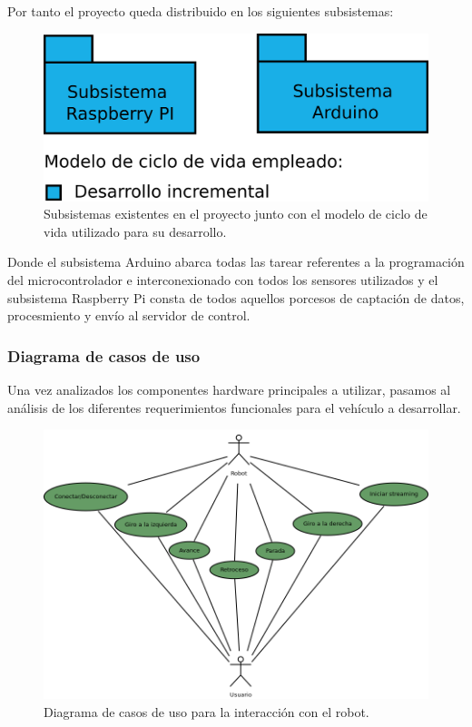 Por tanto el proyecto queda distribuido en los siguientes subsistemas:\\

\begin{figure}[H]
  \begin{center}
    \includegraphics[scale=0.03]{diagramas/subsistemas.png}
  \end{center}
  \caption{Subsistemas existentes en el proyecto junto con el modelo de ciclo de vida
utilizado para su desarrollo.}
  \label{diagrama:subsistemas}
\end{figure}

Donde el subsistema Arduino abarca todas las tarear referentes a la programación del microcontrolador e interconexionado con todos los sensores utilizados y el subsistema Raspberry Pi
consta de todos aquellos porcesos de captación de datos, procesmiento y envío al servidor de control.\\

\subsubsection{Diagrama de casos de uso}

Una vez analizados los componentes hardware principales a utilizar, pasamos al análisis de los diferentes requerimientos funcionales para el vehículo a desarrollar.

\begin{figure}[H]
  \begin{center}
    \includegraphics[scale=.4]{diagramas/casos-uso-robot.png}
  \end{center}
  \caption{Diagrama de casos de uso para la interacción con el robot.}
  \label{diagram:caso-uso}
\end{figure}

